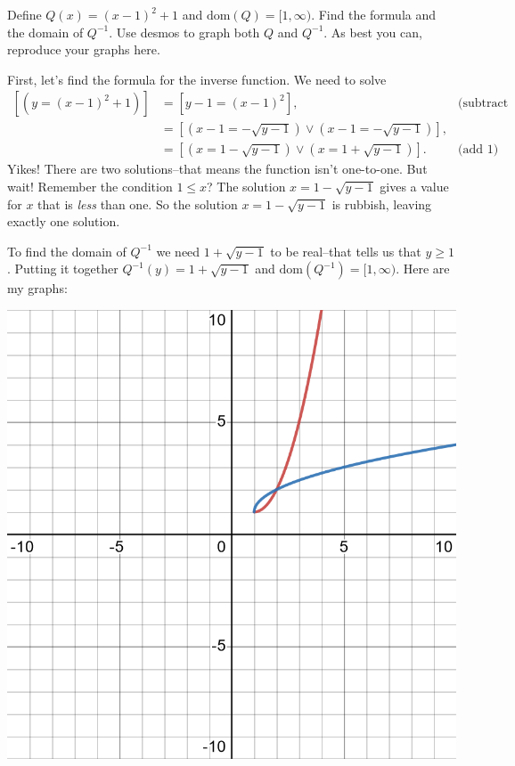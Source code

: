 \documentclass[12pt,fleqn,answers]{exam}
\newcommand{\dom}{\mbox{dom}}
\begin{document}
\begin{questions}
\begin{solution}[3.5in]
\end{solution}

\newpage

\question[5] Define $Q(x) = (x-1)^2 + 1$ and $\dom(Q) = [1,\infty)$. Find the formula
and the domain of $Q^{-1}$. Use desmos to graph both $Q$ and $Q^{-1}$. As best you can,
reproduce your graphs here.
\begin{solution} First, let's find the formula for the  inverse function. We need to solve
\begin{align*}
 \left[ \left(y = (x-1)^2 + 1 \right) \right] &=  \left[ y -  1 = (x-1)^2\right],   & \mbox{(subtract 1)} \\
         &= \left[ \left(x-1 = -\sqrt{y -  1} \right) \lor  \left(x-1 = -\sqrt{y -  1} \right) \right],  \\
         &= \left[ \left(x = 1 -\sqrt{y -  1} \right) \lor  \left(x = 1 +\sqrt{y -  1} \right)\right]. & \mbox{(add 1)}
\end{align*}
Yikes! There are two solutions--that means the function isn't one-to-one. But wait! Remember the condition
\(1 \leq x\)?  The solution \(x = 1 -\sqrt{y -  1}\) gives a value for $x$ that is \emph{less} than one. So the
solution \(x = 1 -\sqrt{y -  1}\) is rubbish, leaving exactly one solution. 

\quad To find the domain of $Q^{-1}$ we need $1 + \sqrt{y -  1}$ to be real--that tells us that $y \geq 1$.  Putting it 
together $Q^{-1}(y) =  1 +  \sqrt{y -  1}$ and $\dom(Q^{-1}) = [1,\infty)$.
Here are my graphs:

\begin{center}
\includegraphics[scale=0.15]{desmos-graph(27).png}
\end{center}


\end{solution}
\end{questions}
\end{document}
